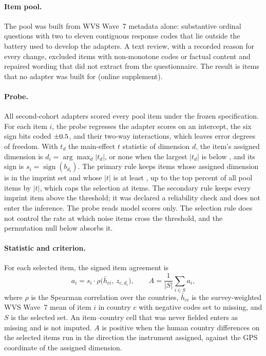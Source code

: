 \paragraph{Item pool.} The pool was built from WVS Wave~7 metadata alone: substantive ordinal questions with two to eleven contiguous response codes that lie outside the battery used to develop the adapters. A text review, with a recorded reason for every change, excluded items with non-monotone codes or factual content and repaired wording that did not extract from the questionnaire. The result is  items that no adapter was built for (online supplement).

\paragraph{Probe.} All  second-cohort adapters scored every pool item under the frozen specification. For each item $i$, the probe regresses the  adapter scores on an intercept, the six sign bits coded $\pm\dc{0.5}{x_code}$, and their  two-way interactions, which leaves  error degrees of freedom. With $t_{d}$ the main-effect $t$ statistic of dimension $d$, the item's assigned dimension is $d_i=\arg\max_d|t_d|$, or none when the largest $|t_d|$ is below , and its sign is $s_i=\operatorname{sign}(b_{d_i})$. The primary rule keeps items whose assigned dimension is in the imprint set and whose $|t|$ is at least , up to the top  percent of all pool items by $|t|$, which caps the selection at  items. The secondary rule keeps every imprint item above the threshold; it was declared a reliability check and does not enter the inference. The probe reads model scores only. The selection rule does not control the rate at which noise items cross the threshold, and the permutation null below absorbs it.

\paragraph{Statistic and criterion.} For each selected item, the signed item agreement is
\begin{equation}
a_i = s_i\cdot\rho\big(\bar h_{ci},\,z_{c,d_i}\big),
\qquad
A=\frac{1}{|S|}\sum_{i\in S}a_i,
\label{eq:screen}
\end{equation}
where $\rho$ is the Spearman correlation over the  countries, $\bar h_{ci}$ is the survey-weighted WVS Wave~7 mean of item $i$ in country $c$ with negative codes set to missing, and $S$ is the selected set. An item--country cell that was never fielded enters as missing and is not imputed. $A$ is positive when the human country differences on the selected items run in the direction the instrument assigned, against the GPS coordinate of the assigned dimension.

